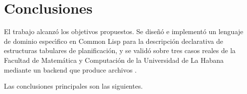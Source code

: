 \chapter*{Conclusiones}

El trabajo alcanz\'o los objetivos propuestos.  Se dise\~n\'o e implement\'o
un lenguaje de dominio espec\'{\i}fico en Common Lisp para la descripci\'on
declarativa de estructuras tabulares de planificaci\'on, y se valid\'o sobre
tres casos reales de la Facultad de Matem\'atica y Computaci\'on de la
Universidad de La Habana mediante un backend que produce archivos \xlsx{}.

Las conclusiones principales son las siguientes.


